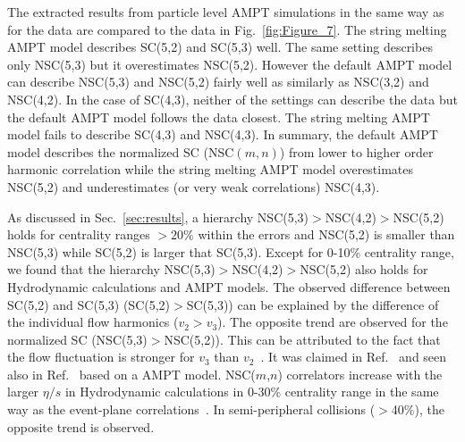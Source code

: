 \documentclass[ALICE,manyauthors]{cernphprep}
\begin{document}
The extracted results  from particle level AMPT simulations in the same way as for the data are compared to the data in Fig.~\ref{fig:Figure_7}.
The string melting AMPT model describes SC(5,2) and SC(5,3) well. The same setting describes only NSC(5,3) but it overestimates NSC(5,2). 
However the default AMPT model can describe NSC(5,3) and NSC(5,2) fairly well as similarly as NSC(3,2) and NSC(4,2).
In the case of SC(4,3), neither of the settings can describe the data but the default AMPT model follows the data closest. 
The string melting AMPT model fails to describe SC(4,3) and NSC(4,3).
In summary, the default AMPT model describes the normalized SC (NSC$(m,n)$) from lower to higher order harmonic correlation while the string melting AMPT model overestimates NSC(5,2) and 
underestimates (or very weak correlations) NSC(4,3). 


As discussed in Sec.~\ref{sec:results}, a hierarchy NSC(5,3)$>$NSC(4,2)$>$NSC(5,2) holds for centrality ranges $>20\%$ within the errors and NSC(5,2) is smaller than NSC(5,3) while SC(5,2) is larger that SC(5,3).
Except for 0-10\% centrality range, we found that the hierarchy NSC(5,3)$>$NSC(4,2)$>$NSC(5,2) also holds for Hydrodynamic calculations and AMPT models.
The observed difference between SC(5,2) and SC(5,3) (SC(5,2)$>$SC(5,3)) can be explained by the difference of the individual flow harmonics ($v_2$$>$$v_3$). 
The opposite trend are observed for the normalized SC (NSC(5,3)$>$NSC(5,2)). This can be attributed to the fact that the flow fluctuation is stronger for $v_3$ than $v_2$~\cite{Aad:2013xma}. It was claimed in Ref.~\cite{Zhu:2016puf} and seen also in Ref.~\cite{Bhalerao:2014xra} based on a AMPT model. 
NSC($m$,$n$) correlators increase with the larger $\eta/s$ in Hydrodynamic calculations in 0-30\% centrality range in the same way as the event-plane correlations~\cite{Bhalerao:2013ina,Teaney:2013dta}. In semi-peripheral collisions ($>$40\%), the opposite trend is observed.
\end{document}
